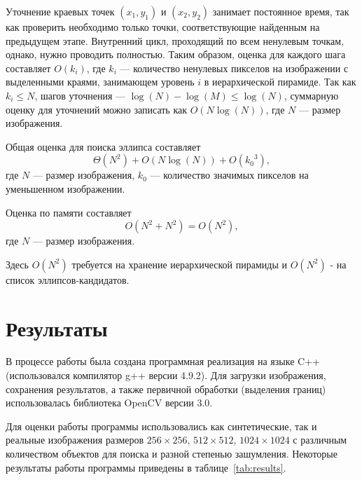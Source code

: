 Уточнение краевых точек \((x_1,y_1)\) и \((x_2,y_2)\) занимает постоянное время, так как проверить необходимо только точки, соответствующие найденным на предыдущем этапе.
Внутренний цикл, проходящий по всем ненулевым точкам, однако, нужно проводить полностью. 
Таким образом, оценка для каждого шага составляет \(O(k_i)\), где \(k_i\) --- количество ненулевых пикселов на изображении с выделенными краями, занимающем уровень \(i\) в иерархической пирамиде.
Так как \(k_i \le N\), шагов уточнения --- \(\log(N) - \log(M) \le \log(N)\), суммарную оценку для уточнений можно записать как
$O(N\log(N))$, где $N$ --- размер изображения.

Общая оценка для поиска эллипса составляет \[\Theta(N^2) + O(N\log(N)) + O({k_0}^3),\]
где $N$ --- размер изображения, $k_0$ --- количество значимых пикселов на уменьшенном изображении.

Оценка по памяти составляет $$O(N^2 + N^2) = O(N^2),$$ где $N$ --- размер изображения. 

Здесь \(O(N^2)\) требуется на хранение иерархической пирамиды и \(O(N^2)\) - на список эллипсов-кандидатов.
\section{Результаты}
В процессе работы была создана программная реализация на языке C++ (использовался компилятор g++ версии 4.9.2). 
Для загрузки изображения, сохранения результатов, а также первичной обработки (выделения границ) использовалась библиотека OpenCV версии 3.0.

Для оценки работы программы использовались как синтетические, так и реальные изображения размеров $256\times256$, $512\times512$, $1024\times1024$ с различным количеством объектов для поиска и разной степенью зашумления.
Некоторые результаты работы программы приведены в таблице~\ref{tab:results}.

